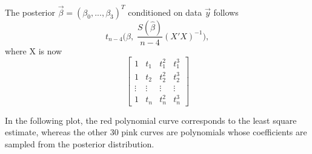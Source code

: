 \documentclass[
]{article}
\newenvironment{Shaded}{\begin{snugshade}}{\end{snugshade}}
\newcommand{\CommentTok}[1]{\textcolor[rgb]{0.56,0.35,0.01}{\textit{#1}}}
\newcommand{\DecValTok}[1]{\textcolor[rgb]{0.00,0.00,0.81}{#1}}
\newcommand{\FunctionTok}[1]{\textcolor[rgb]{0.00,0.00,0.00}{#1}}
\newcommand{\NormalTok}[1]{#1}
\newcommand{\OtherTok}[1]{\textcolor[rgb]{0.56,0.35,0.01}{#1}}
\newcommand{\SpecialCharTok}[1]{\textcolor[rgb]{0.00,0.00,0.00}{#1}}
\begin{document}
The posterior \(\vec\beta = (\beta_0, ..., \beta_3)^T\) conditioned on
data \(\vec y\) follows
\[t_{n-4}\big(\hat\beta, \; \frac{S(\hat\beta)}{n-4}(X'X)^{-1}\big),\]
where X is now \[\begin{bmatrix}
1 & t_1 & t_1^2 & t_1^3 \\
1 & t_2 & t_2^2 &  t_2^3 \\
\vdots & \vdots & \vdots & \vdots \\
1 & t_n & t_n^2 & t_n^3
\end{bmatrix}\]

\begin{Shaded}
\end{Shaded}

In the following plot, the red polynomial curve corresponds to the least
square estimate, whereas the other 30 pink curves are polynomials whose
coefficients are sampled from the posterior distribution.
\end{document}
